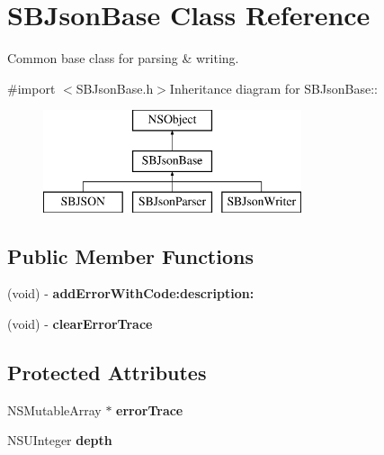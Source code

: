 \hypertarget{interface_s_b_json_base}{
\section{SBJsonBase Class Reference}
\label{interface_s_b_json_base}
}


Common base class for parsing \& writing.  


{\ttfamily \#import $<$SBJsonBase.h$>$}Inheritance diagram for SBJsonBase::\begin{figure}[H]
\begin{center}
\leavevmode
\includegraphics[height=3cm]{interface_s_b_json_base}
\end{center}
\end{figure}
\subsection*{Public Member Functions}
\begin{DoxyCompactItemize}
\item 
\hypertarget{interface_s_b_json_base_af6fc685c386c1c4528bd30b2bd630d56}{
(void) -\/ {\bfseries addErrorWithCode:description:}}
\label{interface_s_b_json_base_af6fc685c386c1c4528bd30b2bd630d56}

\item 
\hypertarget{interface_s_b_json_base_a6a429d6db2149fea7435b9e0aac5d3fa}{
(void) -\/ {\bfseries clearErrorTrace}}
\label{interface_s_b_json_base_a6a429d6db2149fea7435b9e0aac5d3fa}

\end{DoxyCompactItemize}
\subsection*{Protected Attributes}
\begin{DoxyCompactItemize}
\item 
\hypertarget{interface_s_b_json_base_a9fd64724d5da34a0f9842cee3d14620c}{
NSMutableArray $\ast$ {\bfseries errorTrace}}
\label{interface_s_b_json_base_a9fd64724d5da34a0f9842cee3d14620c}

\item 
\hypertarget{interface_s_b_json_base_a5e80155581d240f565ec4149ad812e03}{
NSUInteger {\bfseries depth}}
\label{interface_s_b_json_base_a5e80155581d240f565ec4149ad812e03}

\end{DoxyCompactItemize}
